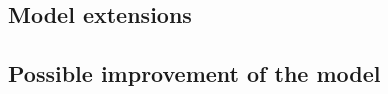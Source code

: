 \documentclass{article}
\begin{document}
\subsection{Model extensions}
\subsection{Possible improvement of the model}
\end{document}
